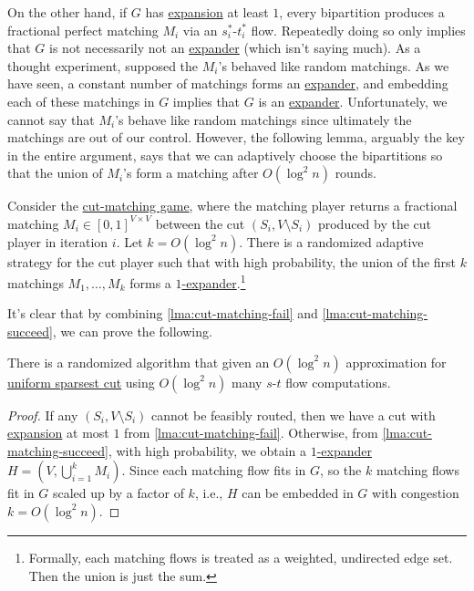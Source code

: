 On the other hand, if \(G\) has \hyperref[def:expansion]{expansion} at least \(1\), every bipartition produces a fractional perfect matching \(M_i\) via an \(s^{\ast} _i\)-\(t^{\ast} _i\) flow. Repeatedly doing so only implies that \(G\) is not necessarily not an \hyperref[def:expander]{expander} (which isn't saying much). As a thought experiment, supposed the \(M_i\)'s behaved like random matchings. As we have seen, a constant number of matchings forms an \hyperref[def:expander]{expander}, and embedding each of these matchings in \(G\) implies that \(G\) is an \hyperref[def:expander]{expander}. Unfortunately, we cannot say that \(M_i\)'s behave like random matchings since ultimately the matchings are out of our control. However, the following lemma, arguably the key in the entire argument, says that we can adaptively choose the bipartitions so that the union of \(M_i\)'s form a matching after \(O(\log ^2 n)\) rounds.

\begin{lemma}\label{lma:cut-matching-succeed}
	Consider the \hyperref[def:cut-matching-game]{cut-matching game}, where the matching player returns a fractional matching \(M_i \in [0, 1]^{V \times V}\) between the cut \((S_i, V\setminus S_i)\) produced by the cut player in iteration \(i\). Let \(k = O(\log ^2 n)\). There is a randomized adaptive strategy for the cut player such that with high probability, the union of the first \(k\) matchings \(M_1, \dots , M_k\) forms a \hyperref[def:expander]{\(1\)-expander}.\footnote{Formally, each matching flows is treated as a weighted, undirected edge set. Then the union is just the sum.}
\end{lemma}

It's clear that by combining \autoref{lma:cut-matching-fail} and \autoref{lma:cut-matching-succeed}, we can prove the following.

\begin{theorem}\label{thm:cut-matching}
	There is a randomized algorithm that given an \(O(\log ^2 n)\) approximation for \hyperref[prb:sparsest-cut]{uniform sparsest cut} using \(O(\log ^2 n)\) many \(s\)-\(t\) flow computations.
\end{theorem}
\begin{proof}
	If any \((S_i, V\setminus S_i)\) cannot be feasibly routed, then we have a cut with \hyperref[def:expansion]{expansion} at most \(1\) from \autoref{lma:cut-matching-fail}. Otherwise, from \autoref{lma:cut-matching-succeed}, with high probability, we obtain a \hyperref[def:expander]{\(1\)-expander} \(H = (V, \bigcup_{i=1}^{k} M_i)\). Since each matching flow fits in \(G\), so the \(k\) matching flows fit in \(G\) scaled up by a factor of \(k\), i.e., \(H\) can be embedded in \(G\) with congestion \(k = O(\log ^2 n)\).
\end{proof}

